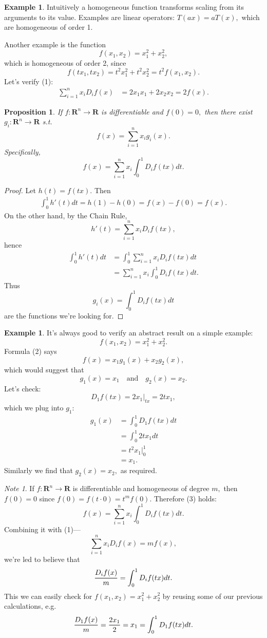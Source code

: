 \documentclass[12pt]{article}
\theoremstyle{plain}
\newtheorem{proposition}[theorem]{Proposition}
\theoremstyle{definition}
\newtheorem{example}[theorem]{Example}
\theoremstyle{remark}
\newtheorem{note}[theorem]{Note}
\renewcommand\frac[2]{\genfrac{}{}{0.6pt}{}{#1}{#2}}
\newcommand{\bR}{\mathbf R}
\newcommand{\0}{\varnothing}
\newcommand{\<}{\langle}
\renewcommand{\>}{\rangle}
\begin{document}
\begin{example}
Intuitively a homogeneous function transforms scaling from its arguments to its value. Examples are linear operators: $ T(ax) = aT(x), $ which are homogeneous of order 1.

Another example is the function \[
  f(x_1, x_2) = x_1^2 + x_2^2,
\]
which is homogeneous of order 2, since \[
f(t x_1, t x_2) = t^2 x_1^2 + t^2 x_2^2 = t^2 f(x_1, x_2).
\]
Let's verify (1): \begin{align*}
\sum_{i=1}^n x_i D_i f(x) &= 2x_1 x_1 + 2x_2 x_2 = 2 f(x).
\end{align*}
\end{example}

\begin{proposition}
If $ f: \bR^n \longrightarrow \bR $ is differentiable and $ f(0) = 0, $ then there exist $ g_i: \bR^n \longrightarrow \bR $ s.t. \[
f(x) = \sum_{i=1}^n x_i g_i (x). \tag{2}
\]
Specifically, \[
f(x) = \sum_{i=1}^n x_i \int_0^1 D_i f(tx) dt. \tag{3}
\]
\end{proposition}

\begin{proof}
Let $ h(t) = f(tx). $ Then \begin{align*}
\int_0^1 h'(t) dt = h(1) - h(0) = f(x) - f(0) = f(x).
\end{align*}
On the other hand, by the Chain Rule, \[
h'(t) = \sum_{i=1}^n x_i D_i f(tx),
\]
hence \begin{align*}
\int_0^1 h'(t) dt &= \int_0^1 \sum_{i=1}^n x_i D_i f(tx) dt \\
&= \sum_{i=1}^n x_i \int_0^1 D_i f(tx) dt.
\end{align*}
Thus \[
g_i (x) = \int_0^1 D_i f(tx) dt
\] are the functions we're looking for.
\end{proof}

\begin{example}
It's always good to verify an abstract result on a simple example: \[
f(x_1, x_2) = x_1^2 + x_2^2.
\]
Formula (2) says \[
f(x) = x_1 g_1 (x) + x_2 g_2 (x),
\]
which would suggest that \[
g_1(x) = x_1 \quad \text{and} \quad g_2(x) = x_2.
\]
Let's check: \[
D_1 f(tx) = 2 x_1 |_{tx} = 2 t x_1,
\]
which we plug into $ g_1 $: \begin{align*}
g_1 (x) &= \int_0^1 D_1 f(tx) dt \\
&= \int_0^1 2 t x_1 dt \\
&= t^2 x_1 |_0^1 \\
&= x_1.
\end{align*}
Similarly we find that $ g_2 (x) = x_2, $ as required.
\end{example}

\begin{note}
If $ f: \bR^n \longrightarrow \bR $ is differentiable and homogeneous of degree $ m, $ then $ f(0) = 0 $ since $ f(0) = f(t \cdot 0) = t^m f(0). $ Therefore (3) holds: \[
  f(x) = \sum_{i=1}^n x_i \int_0^1 D_i f(tx) dt.
\]
Combining it with (1)--- \[
\sum_{i=1}^n x_i D_i f(x) = m f(x),
\] we're led to believe that \[
\frac{D_i f(x)}{m} = \int_0^1 D_i f(tx) dt.
\]
This we can easily check for $ f(x_1, x_2) = x_1^2 + x_2^2 $ by reusing some of our previous calculations, e.g. \[
  \frac{D_1 f(x)}{m} = \frac{2 x_1}{2} = x_1 = \int_0^1 D_1 f(tx) dt.
\]
\end{note}
\end{document}
